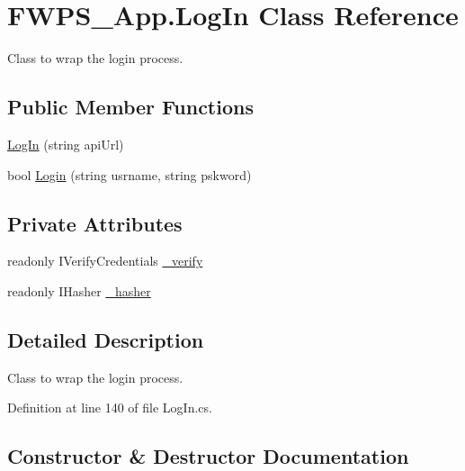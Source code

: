 \hypertarget{class_f_w_p_s___app_1_1_log_in}{}\section{F\+W\+P\+S\+\_\+\+App.\+Log\+In Class Reference}
\label{class_f_w_p_s___app_1_1_log_in}


Class to wrap the login process.  


\subsection*{Public Member Functions}
\begin{DoxyCompactItemize}
\item 
\mbox{\hyperlink{class_f_w_p_s___app_1_1_log_in_a824881c7304f1bf46304030d1b36f1be}{Log\+In}} (string api\+Url)
\item 
bool \mbox{\hyperlink{class_f_w_p_s___app_1_1_log_in_ab71c428971eb55052a152e6e7e5be0bf}{Login}} (string usrname, string pskword)
\end{DoxyCompactItemize}
\subsection*{Private Attributes}
\begin{DoxyCompactItemize}
\item 
readonly I\+Verify\+Credentials \mbox{\hyperlink{class_f_w_p_s___app_1_1_log_in_af0912320a76a9ea8aae6140aa35a928d}{\+\_\+verify}}
\item 
readonly I\+Hasher \mbox{\hyperlink{class_f_w_p_s___app_1_1_log_in_a77038778855a35ff0cb47797e8c17b38}{\+\_\+hasher}}
\end{DoxyCompactItemize}


\subsection{Detailed Description}
Class to wrap the login process. 

Definition at line 140 of file Log\+In.\+cs.



\subsection{Constructor \& Destructor Documentation}
\mbox{\label{class_f_w_p_s___app_1_1_log_in_a824881c7304f1bf46304030d1b36f1be}} 
